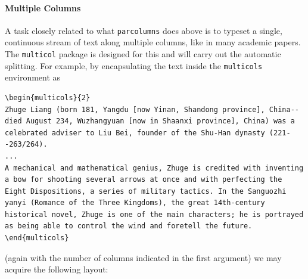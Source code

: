 \paragraph{Multiple Columns} A task closely related to what \verb|parcolumns| does above is to typeset a single, continuous stream of text along multiple columns, like in many academic papers. The \texttt{multicol} package is designed for this and will carry out the automatic splitting. For example, by encapsulating the text inside the \verb|multicols| environment as
\begin{lstlisting}
\begin{multicols}{2}
Zhuge Liang (born 181, Yangdu [now Yinan, Shandong province], China--died August 234, Wuzhangyuan [now in Shaanxi province], China) was a celebrated adviser to Liu Bei, founder of the Shu-Han dynasty (221--263/264).
...
A mechanical and mathematical genius, Zhuge is credited with inventing a bow for shooting several arrows at once and with perfecting the Eight Dispositions, a series of military tactics. In the Sanguozhi yanyi (Romance of the Three Kingdoms), the great 14th-century historical novel, Zhuge is one of the main characters; he is portrayed as being able to control the wind and foretell the future.
\end{multicols}
\end{lstlisting}
(again with the number of columns indicated in the first argument) we may acquire the following layout:
